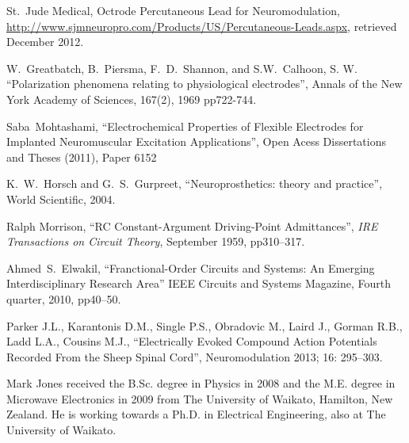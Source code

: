 \documentclass[journal, a4paper]{IEEEtran}
\begin{document}
\begin{thebibliography}{99}
    St.~Jude Medical, Octrode Percutaneous Lead for Neuromodulation,
    \url{http://www.sjmneuropro.com/Products/US/Percutaneous-Leads.aspx},
    retrieved December 2012.

    W.~Greatbatch, B.~Piersma, F.~D.~Shannon, and S.W.~Calhoon, S. W.
    ``Polarization phenomena relating to physiological electrodes'',
    Annals of the New York Academy of Sciences,
    167(2), 1969 pp722-744.


    Saba~Mohtashami,
    ``Electrochemical Properties of Flexible Electrodes for Implanted Neuromuscular Excitation Applications'',
    Open Acess Dissertations and Theses (2011), Paper 6152

    K.~W.~Horsch and G.~S.~Gurpreet,
    ``Neuroprosthetics: theory and practice'',
    World Scientific, 2004.

    Ralph Morrison,
    ``RC Constant-Argument Driving-Point Admittances'',
    {\em IRE Transactions on Circuit Theory},
    September 1959, pp310--317.

    Ahmed~S.~Elwakil,
    ``Franctional-Order Circuits and Systems: An Emerging Interdisciplinary Research Area''
    IEEE Circuits and Systems Magazine, Fourth quarter, 2010, pp40--50.

    Parker J.L., Karantonis D.M., Single P.S., Obradovic M., Laird J., Gorman R.B., Ladd L.A., Cousins M.J.,
    ``Electrically Evoked Compound Action Potentials Recorded From the Sheep Spinal Cord'',
    Neuromodulation 2013; 16: 295--303.





\end{thebibliography}

\begin{IEEEbiography}{Mark Jones}
received the B.Sc. degree in Physics in 2008 and the M.E. degree in Microwave Electronics in 2009 from The University of Waikato, Hamilton, New Zealand.
He is working towards a Ph.D. in Electrical Engineering, also at The University of Waikato.
\end{IEEEbiography}
\end{document}
